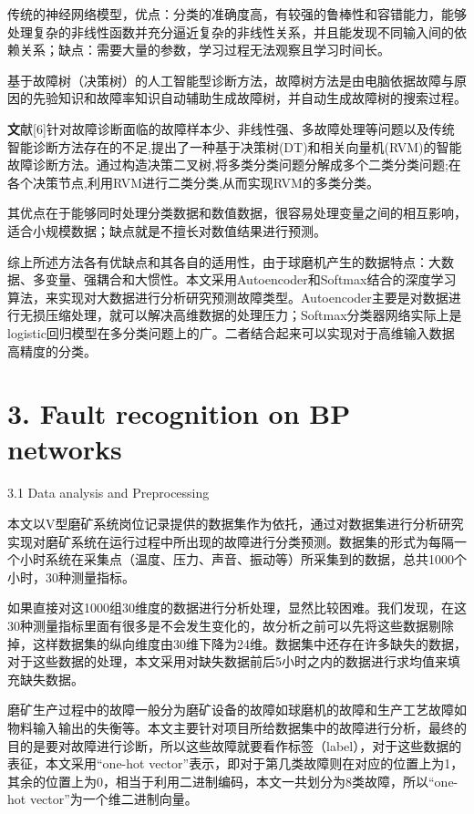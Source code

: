传统的神经网络模型，优点：分类的准确度高，有较强的鲁棒性和容错能力，能够处理复杂的非线性函数并充分逼近复杂的非线性关系，并且能发现不同输入间的依赖关系；缺点：需要大量的参数，学习过程无法观察且学习时间长。

基于故障树（决策树）的人工智能型诊断方法，故障树方法是由电脑依据故障与原因的先验知识和故障率知识自动辅助生成故障树，并自动生成故障树的搜索过程。

\textbf{文}献{[}6{]}针对故障诊断面临的故障样本少、非线性强、多故障处理等问题以及传统智能诊断方法存在的不足,提出了一种基于决策树(DT)和相关向量机(RVM)的智能故障诊断方法。通过构造决策二叉树,将多类分类问题分解成多个二类分类问题;在各个决策节点,利用RVM进行二类分类,从而实现RVM的多类分类。

其优点在于能够同时处理分类数据和数值数据，很容易处理变量之间的相互影响，适合小规模数据；缺点就是不擅长对数值结果进行预测。

综上所述方法各有优缺点和其各自的适用性，由于球磨机产生的数据特点：大数据、多变量、强耦合和大惯性。本文采用Autoencoder和Softmax结合的深度学习算法，来实现对大数据进行分析研究预测故障类型。Autoencoder主要是对数据进行无损压缩处理，就可以解决高维数据的处理压力；Softmax分类器网络实际上是logistic回归模型在多分类问题上的广。二者结合起来可以实现对于高维输入数据高精度的分类。

\section{3. Fault recognition on BP
networks}\label{fault-recognition-on-bp-networks}

3.1 Data analysis and Preprocessing

本文以V型磨矿系统岗位记录提供的数据集作为依托，通过对数据集进行分析研究实现对磨矿系统在运行过程中所出现的故障进行分类预测。数据集的形式为每隔一个小时系统在采集点（温度、压力、声音、振动等）所采集到的数据，总共1000个小时，30种测量指标。

如果直接对这1000组30维度的数据进行分析处理，显然比较困难。我们发现，在这30种测量指标里面有很多是不会发生变化的，故分析之前可以先将这些数据剔除掉，这样数据集的纵向维度由30维下降为24维。数据集中还存在许多缺失的数据，对于这些数据的处理，本文采用对缺失数据前后5小时之内的数据进行求均值来填充缺失数据。

磨矿生产过程中的故障一般分为磨矿设备的故障如球磨机的故障和生产工艺故障如物料输入输出的失衡等。本文主要针对项目所给数据集中的故障进行分析，最终的目的是要对故障进行诊断，所以这些故障就要看作标签（label），对于这些数据的表征，本文采用``one-hot
vector''表示，即对于第几类故障则在对应的位置上为1，其余的位置上为0，相当于利用二进制编码，本文一共划分为8类故障，所以``one-hot
vector''为一个维二进制向量。

